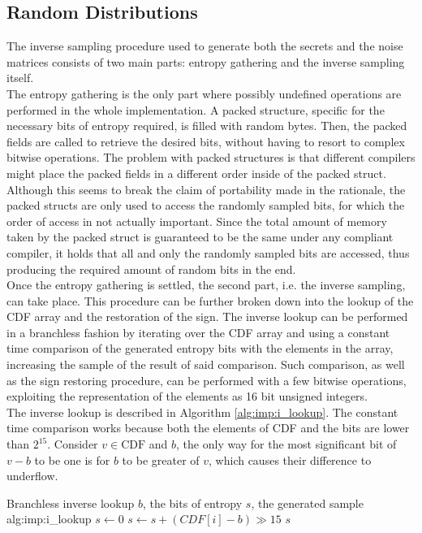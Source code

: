 \subsection{Random Distributions}\label{sec:imp:dist}
The inverse sampling procedure used to generate both the secrets and the noise matrices consists of two main parts: entropy gathering and the inverse sampling itself.\\
The entropy gathering is the only part where possibly undefined operations are performed in the whole implementation. A packed structure, specific for the necessary bits of entropy required, is filled with random bytes. Then, the packed fields are called to retrieve the desired bits, without having to resort to complex bitwise operations. The problem with packed structures is that different compilers might place the packed fields in a different order inside of the packed struct. Although this seems to break the claim of portability made in the rationale, the packed structs are only used to access the randomly sampled bits, for which the order of access in not actually important. Since the total amount of memory taken by the packed struct is guaranteed to be the same under any compliant compiler, it holds that all and only the randomly sampled bits are accessed, thus producing the required amount of random bits in the end.\\
Once the entropy gathering is settled, the second part, i.e. the inverse sampling, can take place. This procedure can be further broken down into the lookup of the CDF array and the restoration of the sign. The inverse lookup can be performed in a branchless fashion by iterating over the CDF array and using a constant time comparison of the generated entropy bits with the elements in the array, increasing the sample of the result of said comparison. Such comparison, as well as the sign restoring procedure, can be performed with a few bitwise operations, exploiting the representation of the elements as 16 bit unsigned integers.\\
The inverse lookup is described in Algorithm \ref{alg:imp:i_lookup}. The constant time comparison works because both the elements of CDF and the bits are lower than $2^{15}$. Consider $v\in\mathrm{CDF}$ and $b$, the only way for the most significant bit of $v-b$ to be one is for $b$ to be greater of $v$, which causes their difference to underflow.\\
\begin{b_algorithm}{Branchless inverse lookup}
{$b$, the bits of entropy}
{$s$, the generated sample}
{alg:imp:i_lookup}
\STATE $s\gets 0$
\STATE $s \gets s + (CDF[i]-b)\gg15$
\ENDFOR
\RETURN $s$
\end{b_algorithm}
